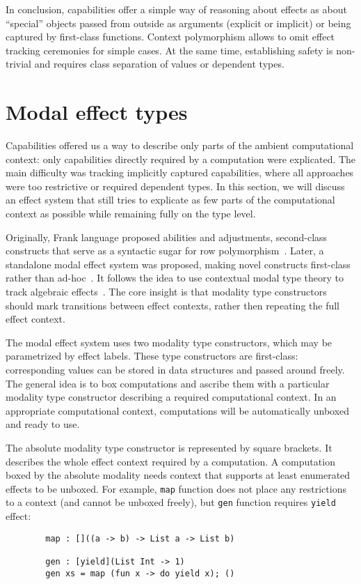 \documentclass[conference]{IEEEtran}
\begin{document}
    In conclusion, capabilities offer a simple way of reasoning about effects as about ``special'' objects passed from outside as arguments (explicit or implicit) or being captured by first-class functions.
    Context polymorphism allows to omit effect tracking ceremonies for simple cases.
    At the same time, establishing safety is non-trivial and requires class separation of values or dependent types.


    \section{Modal effect types} \label{sec:modal}

    Capabilities offered us a way to describe only parts of the ambient computational context: only capabilities directly required by a computation were explicated.
    The main difficulty was tracking implicitly captured capabilities, where all approaches were too restrictive or required dependent types.
    In this section, we will discuss an effect system that still tries to explicate as few parts of the computational context as possible while remaining fully on the type level.

    Originally, Frank language proposed abilities and adjustments, second-class constructs that serve as a syntactic sugar for row polymorphism~\cite{lindley2017do, convent2020doo}.
    Later, a standalone modal effect system was proposed, making novel constructs first-class rather than ad-hoc~\cite{tang2024modal}.
    It follows the idea to use contextual modal type theory to track algebraic effects~\cite{zyuzin2021contextual}.
    The core insight is that modality type constructors should mark transitions between effect contexts, rather then repeating the full effect context.

    The modal effect system uses two modality type constructors, which may be parametrized by effect labels.
    These type constructors are first-class: corresponding values can be stored in data structures and passed around freely.
    The general idea is to box computations and ascribe them with a particular modality type constructor describing a required computational context.
    In an appropriate computational context, computations will be automatically unboxed and ready to use.

    The absolute modality type constructor is represented by square brackets.
    It describes the whole effect context required by a computation.
    A computation boxed by the absolute modality needs context that supports at least enumerated effects to be unboxed.
    For example, \texttt{map} function does not place any restrictions to a context (and cannot be unboxed freely), but \texttt{gen} function requires \texttt{yield} effect:
    \begin{verbatim}
        map : []((a -> b) -> List a -> List b)

        gen : [yield](List Int -> 1)
        gen xs = map (fun x -> do yield x); ()
    \end{verbatim}
\end{document}
